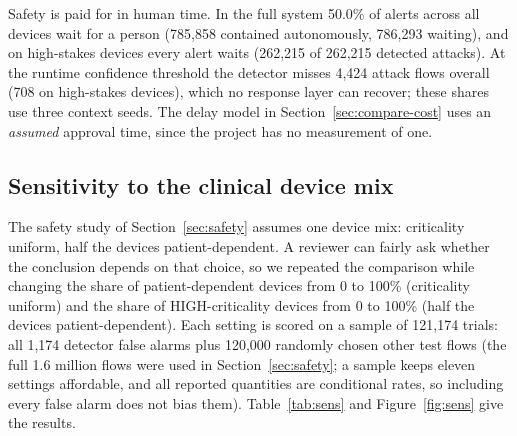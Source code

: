\documentclass[preprint,12pt]{elsarticle}
\begin{document}
Safety is paid for in human time. In the full system 50.0\% of alerts across all devices wait for a person (785,858 contained autonomously, 786,293 waiting), and on high-stakes devices every alert waits (262,215 of 262,215 detected attacks). At the runtime confidence threshold the detector misses 4,424 attack flows overall (708 on high-stakes devices), which no response layer can recover; these shares use three context seeds. The delay model in Section~\ref{sec:compare-cost} uses an \emph{assumed} approval time, since the project has no measurement of one.

\subsection{Sensitivity to the clinical device mix}
\label{sec:sensitivity}
The safety study of Section~\ref{sec:safety} assumes one device mix: criticality uniform, half the devices patient-dependent. A reviewer can fairly ask whether the conclusion depends on that choice, so we repeated the comparison while changing the share of patient-dependent devices from 0 to 100\% (criticality uniform) and the share of HIGH-criticality devices from 0 to 100\% (half the devices patient-dependent). Each setting is scored on a sample of 121,174 trials: all 1,174 detector false alarms plus 120,000 randomly chosen other test flows (the full 1.6 million flows were used in Section~\ref{sec:safety}; a sample keeps eleven settings affordable, and all reported quantities are conditional rates, so including every false alarm does not bias them). Table~\ref{tab:sens} and Figure~\ref{fig:sens} give the results.
\end{document}
